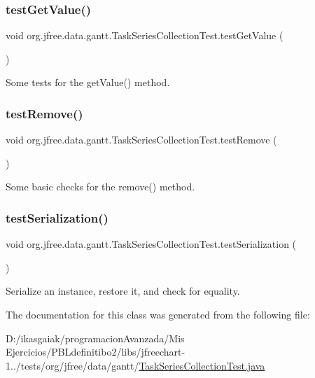 \subsubsection{\texorpdfstring{test\+Get\+Value()}{testGetValue()}}
{\footnotesize\ttfamily void org.\+jfree.\+data.\+gantt.\+Task\+Series\+Collection\+Test.\+test\+Get\+Value (\begin{DoxyParamCaption}{ }\end{DoxyParamCaption})}

Some tests for the get\+Value() method. \mbox{\label{classorg_1_1jfree_1_1data_1_1gantt_1_1_task_series_collection_test_a8b0070388c89bb79fc33dafe866025ce}} 
\subsubsection{\texorpdfstring{test\+Remove()}{testRemove()}}
{\footnotesize\ttfamily void org.\+jfree.\+data.\+gantt.\+Task\+Series\+Collection\+Test.\+test\+Remove (\begin{DoxyParamCaption}{ }\end{DoxyParamCaption})}

Some basic checks for the remove() method. \mbox{\label{classorg_1_1jfree_1_1data_1_1gantt_1_1_task_series_collection_test_ab56b2ba40bf9a5ae740208d1c5639a74}} 
\subsubsection{\texorpdfstring{test\+Serialization()}{testSerialization()}}
{\footnotesize\ttfamily void org.\+jfree.\+data.\+gantt.\+Task\+Series\+Collection\+Test.\+test\+Serialization (\begin{DoxyParamCaption}{ }\end{DoxyParamCaption})}

Serialize an instance, restore it, and check for equality. 

The documentation for this class was generated from the following file\+:\begin{DoxyCompactItemize}
\item 
D\+:/ikasgaiak/programacion\+Avanzada/\+Mis Ejercicios/\+P\+B\+Ldefinitibo2/libs/jfreechart-\/1../tests/org/jfree/data/gantt/\mbox{\hyperlink{_task_series_collection_test_8java}{Task\+Series\+Collection\+Test.\+java}}\end{DoxyCompactItemize}
